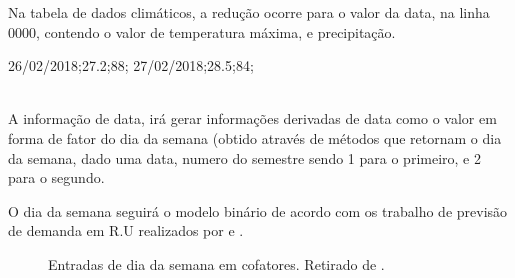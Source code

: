 \documentclass[	12pt, Times, openright, twoside, a4paper, english, brazil]{abntex2}
\begin{document}
            Na tabela de dados climáticos, a redução ocorre para o valor da data, na linha 0000, contendo o valor de temperatura máxima, e precipitação.\\

            \begin{algorithm}
            26/02/2018;27.2;88;
            27/02/2018;28.5;84;
            \end{algorithm}\\

            A informação de data, irá gerar informações derivadas de data como o valor em forma de fator do dia da semana (obtido através de métodos que retornam o dia da semana, dado uma data, numero do semestre sendo 1 para o primeiro, e 2 para o segundo.

            O dia da semana seguirá o modelo binário de acordo com os trabalho de previsão de demanda em R.U realizados por \cite{Lopes2008} e \cite{Rocha2011}.

            \begin{figure}[!ht]
          	\caption{Entradas de dia da semana em cofatores. Retirado de \cite{Lopes2008}.\label{fig:entradasSemanais}}
            \end{figure}
\end{document}
